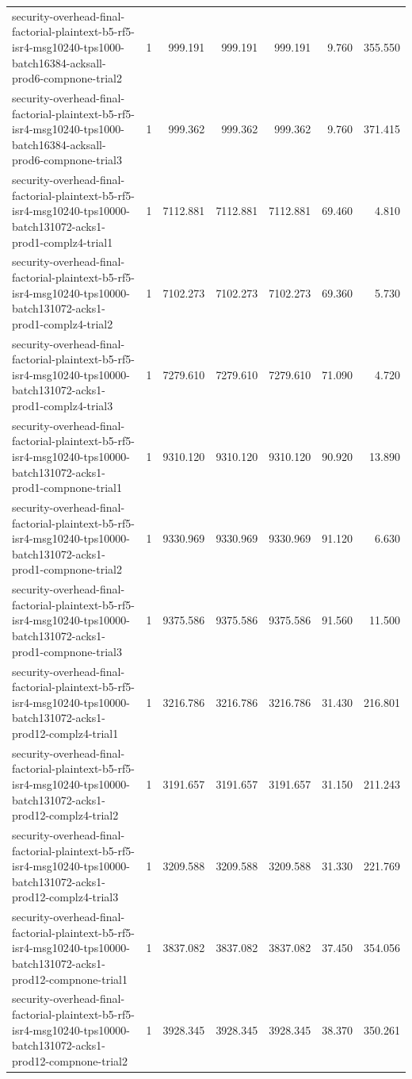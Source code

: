 \begin{tabular}{lrrrrrr}
security-overhead-final-factorial-plaintext-b5-rf5-isr4-msg10240-tps1000-batch16384-acksall-prod6-compnone-trial2 & 1 & 999.191 & 999.191 & 999.191 & 9.760 & 355.550 \\
security-overhead-final-factorial-plaintext-b5-rf5-isr4-msg10240-tps1000-batch16384-acksall-prod6-compnone-trial3 & 1 & 999.362 & 999.362 & 999.362 & 9.760 & 371.415 \\
security-overhead-final-factorial-plaintext-b5-rf5-isr4-msg10240-tps10000-batch131072-acks1-prod1-complz4-trial1 & 1 & 7112.881 & 7112.881 & 7112.881 & 69.460 & 4.810 \\
security-overhead-final-factorial-plaintext-b5-rf5-isr4-msg10240-tps10000-batch131072-acks1-prod1-complz4-trial2 & 1 & 7102.273 & 7102.273 & 7102.273 & 69.360 & 5.730 \\
security-overhead-final-factorial-plaintext-b5-rf5-isr4-msg10240-tps10000-batch131072-acks1-prod1-complz4-trial3 & 1 & 7279.610 & 7279.610 & 7279.610 & 71.090 & 4.720 \\
security-overhead-final-factorial-plaintext-b5-rf5-isr4-msg10240-tps10000-batch131072-acks1-prod1-compnone-trial1 & 1 & 9310.120 & 9310.120 & 9310.120 & 90.920 & 13.890 \\
security-overhead-final-factorial-plaintext-b5-rf5-isr4-msg10240-tps10000-batch131072-acks1-prod1-compnone-trial2 & 1 & 9330.969 & 9330.969 & 9330.969 & 91.120 & 6.630 \\
security-overhead-final-factorial-plaintext-b5-rf5-isr4-msg10240-tps10000-batch131072-acks1-prod1-compnone-trial3 & 1 & 9375.586 & 9375.586 & 9375.586 & 91.560 & 11.500 \\
security-overhead-final-factorial-plaintext-b5-rf5-isr4-msg10240-tps10000-batch131072-acks1-prod12-complz4-trial1 & 1 & 3216.786 & 3216.786 & 3216.786 & 31.430 & 216.801 \\
security-overhead-final-factorial-plaintext-b5-rf5-isr4-msg10240-tps10000-batch131072-acks1-prod12-complz4-trial2 & 1 & 3191.657 & 3191.657 & 3191.657 & 31.150 & 211.243 \\
security-overhead-final-factorial-plaintext-b5-rf5-isr4-msg10240-tps10000-batch131072-acks1-prod12-complz4-trial3 & 1 & 3209.588 & 3209.588 & 3209.588 & 31.330 & 221.769 \\
security-overhead-final-factorial-plaintext-b5-rf5-isr4-msg10240-tps10000-batch131072-acks1-prod12-compnone-trial1 & 1 & 3837.082 & 3837.082 & 3837.082 & 37.450 & 354.056 \\
security-overhead-final-factorial-plaintext-b5-rf5-isr4-msg10240-tps10000-batch131072-acks1-prod12-compnone-trial2 & 1 & 3928.345 & 3928.345 & 3928.345 & 38.370 & 350.261 \\

\end{tabular}
